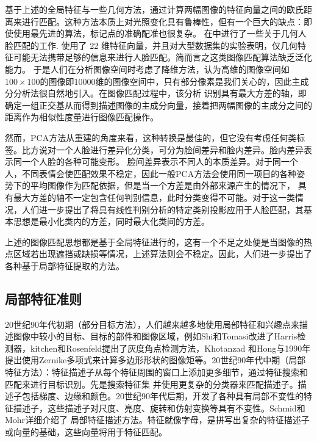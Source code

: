 基于上述的全局特征与一些几何方法，通过计算两幅图像的特征向量之间的欧氏距离来进行匹配。这种方法本质上对光照变化具有鲁棒性，但有一个巨大的缺点：即使使用最先进的算法，标记点的准确配准也很复杂。
在\cite{brunelli1992face}中进行了一些关于几何人脸匹配的工作. 使用了 22 维特征向量，并且对大型数据集的实验表明，仅几何特征可能无法携带足够的信息来进行人脸匹配。简而言之这类图像匹配算法缺乏泛化能力。
于是人们在分析图像空间时考虑了降维方法，认为高维的图像空间如$100 \times 100$的图像即10000维的图像空间中，只有部分像素是我们关心的，因此主成分分析法很自然地引入。在图像匹配过程中，该分析
识别具有最大方差的轴，即确定一组正交基从而得到描述图像的主成分向量，接着把两幅图像的主成分之间的距离作为相似性度量进行图像匹配操作。

然而，PCA方法从重建的角度来看，这种转换是最佳的，但它没有考虑任何类标签。比方说对一个人脸进行差异化分类，可分为脸间差异和脸内差异。脸内差异表示同一个人脸的各种可能变形。
脸间差异表示不同人的本质差异。对于同一个人，不同表情会使匹配效果不稳定，因此一般PCA方法会使用同一项目的各种姿势下的平均图像作为匹配依据，但是当一个方差是由外部来源产生的情况下，
具有最大方差的轴不一定包含任何判别信息，此时分类变得不可能。对于这一类情况，人们进一步提出了将具有线性判别分析的特定类别投影应用于人脸匹配\cite{turk1991eigenfaces}，其基本思想是最小化类内的方差，同时最大化类间的方差。

上述的图像匹配思想都是基于全局特征进行的，这有一个不足之处便是当图像的热点区域若出现遮挡或缺损等情况，上述算法则会不稳定。因此，人们进一步提出了各种基于局部特征提取的方法。

\subsection{局部特征准则}

20世纪90年代初期（部分目标方法），人们越来越多地使用局部特征和兴趣点来描述图像中较小的目标、目标的部件和图像区域，例如Shi和Tomasi\cite{shi1994good}改进了Harris检测器，kitchen和Rosenfeld\cite{kitchen1982gray}提出了灰度角点检测方法，Khotanzad
和Hong\cite{khotanzad1990invariant}与1990年提出使用Zernike多项式来计算多边形形状的图像矩等。20世纪90年代中期（局部特征方法）：特征描述子从每个特征周围的窗口上添加更多细节，通过特征搜索和匹配来进行目标识别。先是搜索特征集
并使用更复杂的分类器来匹配描述子。描述子包括梯度、边缘和颜色。20世纪90年代后期，开发了各种具有局部不变性的特征描述子，这些描述子对尺度、亮度、旋转和仿射变换等具有不变性。Schmid和Mohr\cite{schmid1997object}详细介绍了
局部特征描述方法。特征就像字母，是拼写出复杂的特征描述子或向量的基础，这些向量将用于特征匹配。


